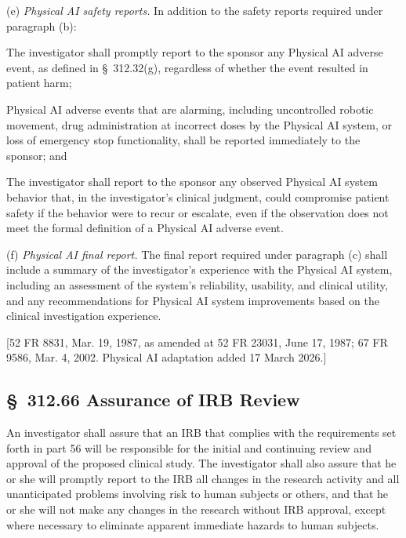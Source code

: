 (e) \textit{Physical AI safety reports.} In addition to the safety reports required under paragraph (b):

\begin{description}[leftmargin=0.8cm,style=sameline]
\item[(i)] The investigator shall promptly report to the sponsor any Physical AI adverse event, as defined in \S~312.32(g), regardless of whether the event resulted in patient harm;
\item[(ii)] Physical AI adverse events that are alarming, including uncontrolled robotic movement, drug administration at incorrect doses by the Physical AI system, or loss of emergency stop functionality, shall be reported immediately to the sponsor; and
\item[(iii)] The investigator shall report to the sponsor any observed Physical AI system behavior that, in the investigator's clinical judgment, could compromise patient safety if the behavior were to recur or escalate, even if the observation does not meet the formal definition of a Physical AI adverse event.
\end{description}

(f) \textit{Physical AI final report.} The final report required under paragraph (c) shall include a summary of the investigator's experience with the Physical AI system, including an assessment of the system's reliability, usability, and clinical utility, and any recommendations for Physical AI system improvements based on the clinical investigation experience.

[52 FR 8831, Mar. 19, 1987, as amended at 52 FR 23031, June 17, 1987; 67 FR 9586, Mar. 4, 2002. Physical AI adaptation added 17 March 2026.]

\subsection{\S~312.66 Assurance of IRB Review}

An investigator shall assure that an IRB that complies with the requirements set forth in part 56 will be responsible for the initial and continuing review and approval of the proposed clinical study. The investigator shall also assure that he or she will promptly report to the IRB all changes in the research activity and all unanticipated problems involving risk to human subjects or others, and that he or she will not make any changes in the research without IRB approval, except where necessary to eliminate apparent immediate hazards to human subjects.

